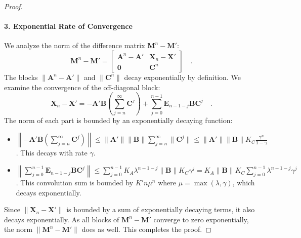 \documentclass[../../main.tex]{subfiles}
\begin{document}
\begin{proof}
\paragraph{3. Exponential Rate of Convergence}
We analyze the norm of the difference matrix $\bm{M}^n - \bm{M}'$:
\[
    \bm{M}^n - \bm{M}' = 
    \begin{bmatrix}
        \bm{A}^n - \bm{A}' & \bm{X}_n - \bm{X}' \\
        \bm{0} & \bm{C}^n
    \end{bmatrix}
    \quad .
\]
The blocks $\|\bm{A}^n - \bm{A}'\|$ and $\|\bm{C}^n\|$ decay exponentially by definition. We examine the convergence of the off-diagonal block:
\[
    \bm{X}_n - \bm{X}' = -\bm{A}'\bm{B}\left(\sum_{j=n}^{\infty}\bm{C}^j\right) + \sum_{j=0}^{n-1}\bm{E}_{n-1-j}\bm{B}\bm{C}^j \quad .
\]
The norm of each part is bounded by an exponentially decaying function:
\begin{itemize}
    \item $\left\|-\bm{A}'\bm{B}\left(\sum_{j=n}^{\infty}\bm{C}^j\right)\right\| \le \|\bm{A}'\|\|\bm{B}\| \sum_{j=n}^{\infty}\|\bm{C}^j\| \le \|\bm{A}'\|\|\bm{B}\| K_C \frac{\gamma^n}{1-\gamma}$. This decays with rate $\gamma$.
    \item $\left\|\sum_{j=0}^{n-1}\bm{E}_{n-1-j}\bm{B}\bm{C}^j\right\| \le \sum_{j=0}^{n-1} K_A\lambda^{n-1-j} \|\bm{B}\| K_C\gamma^j = K_A \|\bm{B}\| K_C \sum_{j=0}^{n-1} \lambda^{n-1-j} \gamma^j$. This convolution sum is bounded by $K'n\mu^n$ where $\mu = \max(\lambda, \gamma)$, which decays exponentially.
\end{itemize}
Since $\|\bm{X}_n - \bm{X}'\|$ is bounded by a sum of exponentially decaying terms, it also decays exponentially. As all blocks of $\bm{M}^n - \bm{M}'$ converge to zero exponentially, the norm $\|\bm{M}^n - \bm{M}'\|$ does as well. This completes the proof.
\end{proof}
\end{document}
